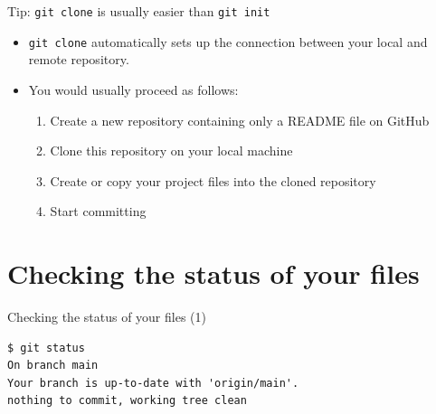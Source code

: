 \documentclass[handout]{beamer}
\begin{document}
\begin{frame}{Tip: \texttt{git clone} is usually easier than \texttt{git init}}
	\begin{itemize}
		\item \texttt{git clone} automatically sets up the connection between your local and remote repository. 
		\item You would usually proceed as follows:
		\begin{enumerate}
			\item Create a new repository containing only a README file on GitHub
			\item Clone this repository on your local machine
			\item Create or copy your project files into the cloned repository
			\item Start committing
		\end{enumerate}
	\end{itemize}
\end{frame}

\section{Checking the status of your files}

\begin{frame}[fragile]{Checking the status of your files (1)}

\begin{lstlisting}
$ git status
On branch main
Your branch is up-to-date with 'origin/main'.
nothing to commit, working tree clean
\end{lstlisting}

\end{frame}
\end{document}
